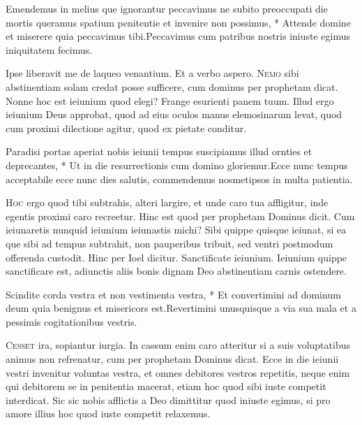 \begin{multicols*}{2}
\begin{responsory-doxology}
{Emendemus in melius que ignorantur peccavimus ne subito preoccupati die mortis queramus spatium penitentie et invenire non possimus, * Attende domine et miserere quia peccavimus tibi.}{Peccavimus cum patribus nostris iniuste egimus iniquitatem fecimus.}
\end{responsory-doxology}
 \V Ipse liberavit me de laqueo venantium. \R Et a verbo aspero.
\lettrine[lines=2]{\zallmancaps \color{Blue} N}{emo} sibi abstinentiam solam credat posse sufficere, cum dominus per prophetam dicat. Nonne hoc est ieiunium quod elegi? Frange esurienti panem tuum. Illud ergo ieiunium Deus approbat, quod ad eius oculos manus elemosinarum levat, quod cum proximi dilectione agitur, quod ex pietate conditur.
\begin{responsory}
{Paradisi portas aperiat nobis ieiunii tempus suscipiamus illud ornties et deprecantes, * Ut in die resurrectionis cum domino gloriemur.}{Ecce nunc tempus acceptabile ecce nunc dies salutis, commendemus nosmetipsos in multa patientia.}
\end{responsory}
\lettrine[lines=2]{\zallmancaps \color{Red} H}{oc} ergo quod tibi subtrahis, alteri largire, et unde caro tua affligitur, inde egentis proximi caro recreetur. Hinc est quod per prophetam Dominus dicit. Cum ieiunaretis nunquid ieiunium ieiunastis michi? Sibi quippe quisque ieiunat, si ea que sibi ad tempus subtrahit, non pauperibus tribuit, sed ventri postmodum offerenda custodit. Hinc per Ioel dicitur. Sanctificate ieiunium. Ieiunium quippe sanctificare est, adiunctis aliis bonis dignam Deo abstinentiam carnis ostendere.
\begin{responsory}
{Scindite corda vestra et non vestimenta vestra, * Et convertimini ad dominum deum quia benignus et misericors est.}{Revertimini unusquisque a via sua mala et a pessimis cogitationibus vestris.}
\end{responsory}
\lettrine[lines=2]{\zallmancaps \color{Blue} C}{esset} ira, sopiantur iurgia. In cassum enim caro atteritur si a suis voluptatibus animus non refrenatur, cum per prophetam Dominus dicat. Ecce in die ieiunii vestri invenitur voluntas vestra, et omnes debitores vestros repetitis, neque enim qui debitorem se in penitentia macerat, etiam hoc quod sibi iuste competit interdicat. Sic sic nobis afflictis a Deo dimittitur quod iniuste egimus, si pro amore illius hoc quod iuste competit relaxemus.

\end{multicols*}
